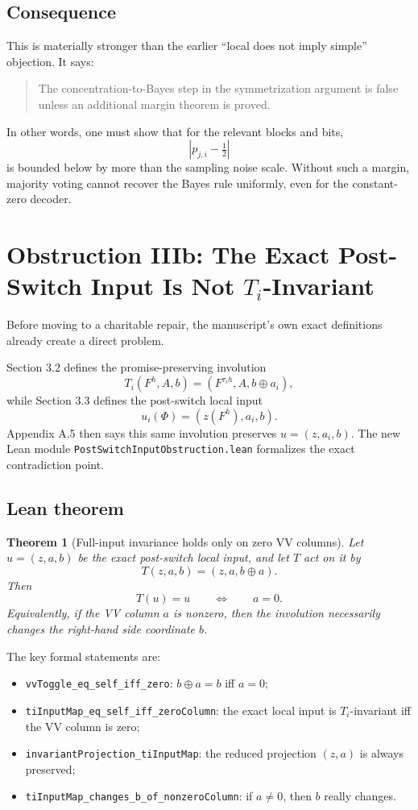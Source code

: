 \documentclass[11pt]{article}
\newtheorem{theorem}{Theorem}[section]
\theoremstyle{remark}
\begin{document}
\subsection{Consequence}

This is materially stronger than the earlier ``local does not imply simple'' objection.  It says:

\begin{quote}
The concentration-to-Bayes step in the symmetrization argument is false unless an additional
margin theorem is proved.
\end{quote}

In other words, one must show that for the relevant blocks and bits,
\[
  \left| p_{j,i} - \tfrac12 \right|
\]
is bounded below by more than the sampling noise scale.  Without such a margin, majority voting
cannot recover the Bayes rule uniformly, even for the constant-zero decoder.

\section{Obstruction IIIb: The Exact Post-Switch Input Is Not \(T_i\)-Invariant}

Before moving to a charitable repair, the manuscript's own exact definitions already create a
direct problem.

Section 3.2 defines the promise-preserving involution
\[
  T_i(F^h, A, b) = (F^{\tau_i h}, A, b \oplus a_i),
\]
while Section 3.3 defines the post-switch local input
\[
  u_i(\Phi) = (z(F^h), a_i, b).
\]
Appendix A.5 then says this same involution preserves \(u=(z,a_i,b)\).  The new Lean module
\texttt{PostSwitchInputObstruction.lean} formalizes the exact contradiction point.

\subsection{Lean theorem}

\begin{theorem}[Full-input invariance holds only on zero VV columns]
Let \(u = (z,a,b)\) be the exact post-switch local input, and let \(T\) act on it by
\[
  T(z,a,b) = (z,a,b \oplus a).
\]
Then
\[
  T(u) = u
  \qquad\Longleftrightarrow\qquad
  a = 0.
\]
Equivalently, if the VV column \(a\) is nonzero, then the involution necessarily changes the
right-hand side coordinate \(b\).
\end{theorem}

\noindent
The key formal statements are:
\begin{itemize}[leftmargin=1.5em]
  \item \texttt{vvToggle\_eq\_self\_iff\_zero}: \(b \oplus a = b\) iff \(a=0\);
  \item \texttt{tiInputMap\_eq\_self\_iff\_zeroColumn}: the exact local input is \(T_i\)-invariant
  iff the VV column is zero;
  \item \texttt{invariantProjection\_tiInputMap}: the reduced projection \((z,a)\) is always
  preserved;
  \item \texttt{tiInputMap\_changes\_b\_of\_nonzeroColumn}: if \(a \neq 0\), then \(b\) really
  changes.
\end{itemize}
\end{document}
